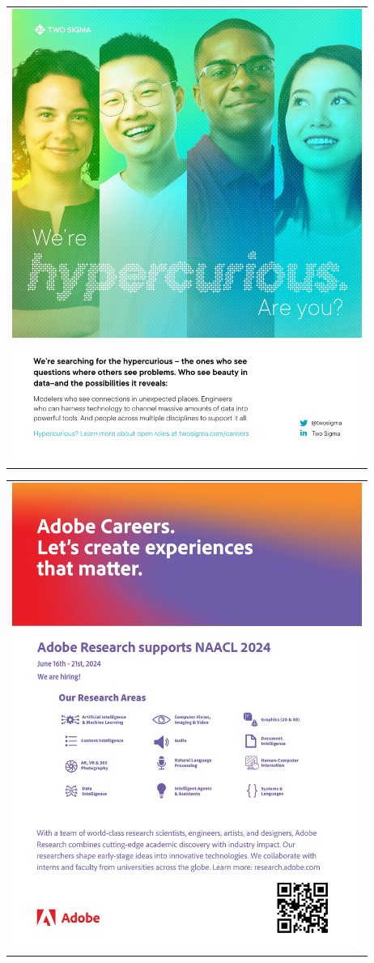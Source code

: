 \begin{center}\begin{tabular}{c}
  \includegraphics[width=4.5in]{content/ads/twosigma} \\
\end{tabular}\end{center}
\begin{center}\begin{tabular}{c}
  \includegraphics[width=4.5in]{content/ads/adobe} \\
\end{tabular}\end{center}
